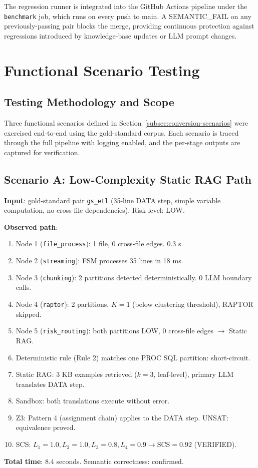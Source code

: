 The regression runner is integrated into the GitHub Actions pipeline under the
\texttt{benchmark} job, which runs on every push to main. A SEMANTIC\_FAIL on
any previously-passing pair blocks the merge, providing continuous protection
against regressions introduced by knowledge-base updates or LLM prompt changes.

\section{Functional Scenario Testing}
\label{sec:scenario-testing}

\subsection{Testing Methodology and Scope}
\label{subsec:test-methodology}

Three functional scenarios defined in Section~\ref{subsec:conversion-scenarios}
were exercised end-to-end using the gold-standard corpus. Each scenario is
traced through the full pipeline with logging enabled, and the per-stage outputs
are captured for verification.

\subsection{Scenario A: Low-Complexity Static RAG Path}
\label{subsec:scenario-a}

\textbf{Input}: gold-standard pair \texttt{gs\_etl} (35-line DATA step,
simple variable computation, no cross-file dependencies). Risk level: LOW.

\textbf{Observed path}:
\begin{enumerate}
  \item Node 1 (\texttt{file\_process}): 1 file, 0 cross-file edges. 0.3 s.
  \item Node 2 (\texttt{streaming}): FSM processes 35 lines in 18 ms.
  \item Node 3 (\texttt{chunking}): 2 partitions detected deterministically.
    0 LLM boundary calls.
  \item Node 4 (\texttt{raptor}): 2 partitions, $K=1$ (below clustering
    threshold), RAPTOR skipped.
  \item Node 5 (\texttt{risk\_routing}): both partitions LOW, 0 cross-file
    edges $\rightarrow$ Static RAG.
  \item Deterministic rule (Rule 2) matches one PROC SQL partition: short-circuit.
  \item Static RAG: 3 KB examples retrieved ($k=3$, leaf-level), primary LLM translates DATA step.
  \item Sandbox: both translations execute without error.
  \item Z3: Pattern 4 (assignment chain) applies to the DATA step. UNSAT:
    equivalence proved.
  \item SCS: $L_1=1.0, L_2=1.0, L_3=0.8, L_4=0.9 \rightarrow \mathrm{SCS}=0.92$
    (VERIFIED).
\end{enumerate}
\textbf{Total time}: 8.4 seconds. Semantic correctness: confirmed.

